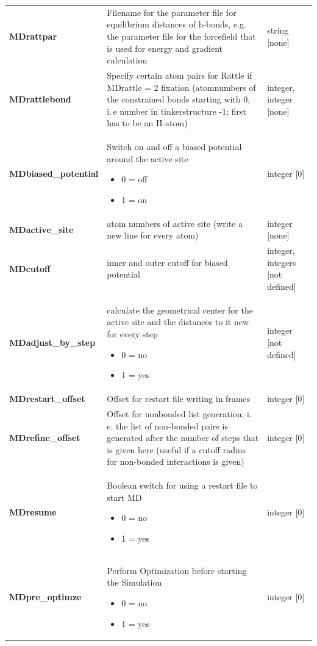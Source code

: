 \documentclass[10pt,a4paper]{article} %
\begin{document}
\begin{longtable}{|p{3.5cm}|p{5cm}|p{3cm}|}
		\textbf{MDrattpar} & Filename for the parameter file for equilibrium distances of h-bonds, e.g. the parameter file for the forcefield that is used for energy and gradient calculation & string [none]  \\
		\textbf{MDrattlebond} & Specify certain atom pairs for Rattle\supercite{rattle} if MDrattle = 2 fixation (atomnumbers of the constrained bonds starting with 0, i.\,e number in tinkerstructure -1; first has to be an H-atom) & integer, integer [none] \\
			\textbf{MDbiased\_potential} & Switch on and off a biased potential around the active site \begin{itemize} \item 0 = off \item 1  = on \end{itemize} & integer [0] \\
		\textbf{MDactive\_site} & atom numbers of active site (write a new line for every atom) & integer [none] \\
		\textbf{MDcutoff} & inner and outer cutoff for biased potential & integer, integers [not defined] \\
		\textbf{MDadjust\_by\_step} & calculate the geometrical center for the active site and the distances to it new for every step \begin{itemize} \item 0 = no \item 1  = yes \end{itemize} & integer [not defined] \\
		\textbf{MDrestart\_offset} & Offset for restart file writing in frames & integer [0] \\
		\textbf{MDrefine\_offset} & Offset for nonbonded list generation, i.\,e. the list of non-bonded pairs is generated after the number of steps that is given here (useful if a cutoff radius for non-bonded interactions is given) & integer [0]  \\
		\textbf{MDresume} & Boolean switch for using a restart file to start MD\begin{itemize} \item 0 = no \item 1 = yes\end{itemize}& integer [0] \\
		\textbf{MDpre\_optimze} & Perform Optimization before starting the Simulation \begin{itemize} \item 0 = no \item 1 = yes\end{itemize}& integer [0] \\
			\end{longtable} 
	
\end{document}
